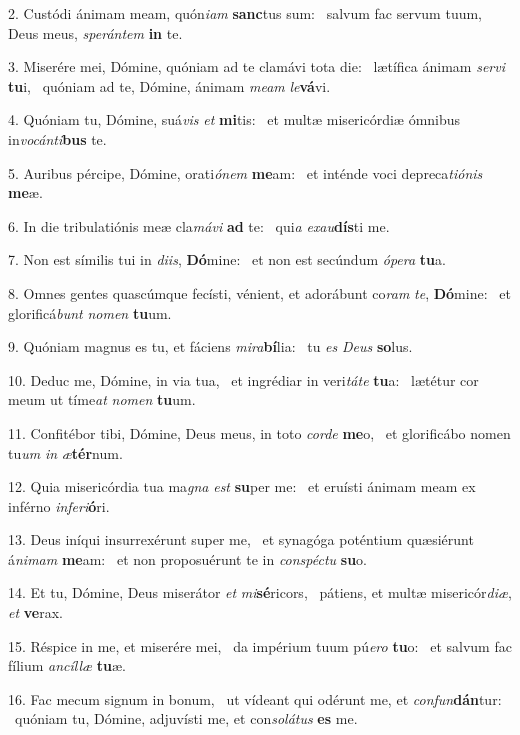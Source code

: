 2. Custódi ánimam meam, quón\textit{i}\textit{am} \textbf{sanc}tus sum: \ast\  salvum fac servum tuum, Deus meus, \textit{spe}\textit{rán}\textit{tem} \textbf{in} te.\

3. Miserére mei, Dómine, quóniam ad te clamávi tota die: \dag\  lætífica ánimam \textit{ser}\textit{vi} \textbf{tu}i, \ast\  quóniam ad te, Dómine, ánimam \textit{me}\textit{am} \textit{le}\textbf{vá}vi.\

4. Quóniam tu, Dómine, suá\textit{vis} \textit{et} \textbf{mi}tis: \ast\  et multæ misericórdiæ ómnibus in\textit{vo}\textit{cán}\textit{ti}\textbf{bus} te.\

5. Auribus pércipe, Dómine, orati\textit{ó}\textit{nem} \textbf{me}am: \ast\  et inténde voci depreca\textit{ti}\textit{ó}\textit{nis} \textbf{me}æ.\

6. In die tribulatiónis meæ cla\textit{má}\textit{vi} \textbf{ad} te: \ast\  qui\textit{a} \textit{ex}\textit{au}\textbf{dís}ti me.\

7. Non est símilis tui in \textit{di}\textit{is}, \textbf{Dó}mine: \ast\  et non est secúndum \textit{ó}\textit{pe}\textit{ra} \textbf{tu}a.\

8. Omnes gentes quascúmque fecísti, vénient, et adorábunt co\textit{ram} \textit{te}, \textbf{Dó}mine: \ast\  et glorificá\textit{bunt} \textit{no}\textit{men} \textbf{tu}um.\

9. Quóniam magnus es tu, et fáciens \textit{mi}\textit{ra}\textbf{bí}lia: \ast\  tu \textit{es} \textit{De}\textit{us} \textbf{so}lus.\

10. Deduc me, Dómine, in via tua, \dag\  et ingrédiar in veri\textit{tá}\textit{te} \textbf{tu}a: \ast\  lætétur cor meum ut tíme\textit{at} \textit{no}\textit{men} \textbf{tu}um.\

11. Confitébor tibi, Dómine, Deus meus, in toto \textit{cor}\textit{de} \textbf{me}o, \ast\  et glorificábo nomen tu\textit{um} \textit{in} \textit{æ}\textbf{tér}num.\

12. Quia misericórdia tua ma\textit{gna} \textit{est} \textbf{su}per me: \ast\  et eruísti ánimam meam ex inférno \textit{in}\textit{fe}\textit{ri}\textbf{ó}ri.\

13. Deus iníqui insurrexérunt super me, \dag\  et synagóga poténtium quæsiérunt á\textit{ni}\textit{mam} \textbf{me}am: \ast\  et non proposuérunt te in \textit{con}\textit{spéc}\textit{tu} \textbf{su}o.\

14. Et tu, Dómine, Deus miserátor \textit{et} \textit{mi}\textbf{sé}ricors, \ast\  pátiens, et multæ misericór\textit{di}\textit{æ}, \textit{et} \textbf{ve}rax.\

15. Réspice in me, et miserére mei, \dag\  da impérium tuum pú\textit{e}\textit{ro} \textbf{tu}o: \ast\  et salvum fac fílium \textit{an}\textit{cíl}\textit{læ} \textbf{tu}æ.\

16. Fac mecum signum in bonum, \dag\  ut vídeant qui odérunt me, et \textit{con}\textit{fun}\textbf{dán}tur: \ast\  quóniam tu, Dómine, adjuvísti me, et con\textit{so}\textit{lá}\textit{tus} \textbf{es} me.\

